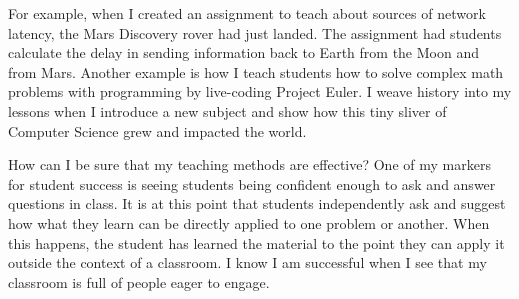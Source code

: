 \documentclass[12pt,a4paper]{article}
\begin{document}
For example, when I created an assignment to teach about sources of network latency, the Mars Discovery rover had just landed.
The assignment had students calculate the delay in sending information back to Earth from the Moon and from Mars.
Another example is how I teach students how to solve complex math problems with programming by live-coding Project Euler.
I weave history into my lessons when I introduce a new subject and show how this tiny sliver of Computer Science grew and impacted the world.

How can I be sure that my teaching methods are effective?
One of my markers for student success is seeing students being confident enough to ask and answer questions in class.
It is at this point that students independently ask and suggest how what they learn can be directly applied to one problem or another.
When this happens, the student has learned the material to the point they can apply it outside the context of a classroom.
I know I am successful when I see that my classroom is full of people eager to engage.

\end{document}
